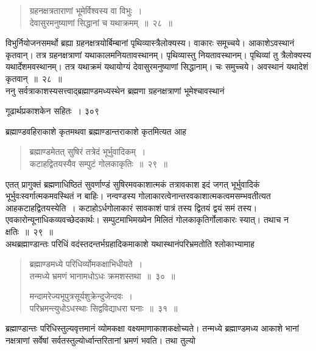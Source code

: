 \documentclass[11pt, openany]{book}
\begin{document}
 \begin{quote}
 {\ssi ग्रहनक्षत्रताराणां भूमेर्विश्वस्य वा विभुः~।\\
देवासुरमनुष्याणां सिद्धानां च यथाक्रमम्~॥~२८~॥}
\end{quote}

 विभुर्नियोजनसमर्थो ब्रह्या ग्रहनक्षत्रयोर्बिम्बानां पृथिव्यास्त्रैलोक्यस्य। वाकारः समूच्चये। आकाशेऽवस्थानं कृतवान्। तत्र ग्रहनक्षत्राणां यथाकालमनियतावस्थानम्। पृथिव्यास्तु नियतावस्थानम्। पृथिव्यां तु त्रैलोक्यस्य यथार्देशमवस्थानम्। तत्र यथाक्रमं यथायोग्यं देवासुरमनुष्याणां सिद्धानाम्। चः समुच्चये। अवस्थानं यथादेशं कृतवान्~॥~२८~॥ \\
\noindent ननु सर्वत्राकाशस्यसत्त्वाद्ब्रह्माण्डमध्यस्थेन ब्रह्मणा ग्रहनक्षत्राणां भूमेश्चावस्थानं \textendash


\newpage


\hspace{3cm} गूढार्थप्रकाशकेन सहितः~।  \hfill ३०९
\vspace{1cm}


\noindent ब्रह्माण्डवहिराकाशे कृतमथवा ब्रह्माण्डान्तराकाशे कृतमित्यत आह \textendash

 \begin{quote}
{\ssi ब्रह्माण्डमेतत् सुषिरं तत्रेदं भूर्भुवादिकम्~।\\
कटाहद्वितयस्यैव सम्पुटं गोलकाकृतिः~॥~२९~॥}
\end{quote}
 एतत् प्रागुक्तं ब्रह्मणाधिष्ठितं सुवर्णाण्डं सुषिरमवकाशात्मकं तत्रावकाश इदं जगत् भूर्भुवादिकं भूर्भुवःस्वर्गात्मकमवस्थितं न बाहिः। नन्वण्डस्य गोलाकारत्वेनान्तरवकाशात्मकत्वमसम्भवतीत्यत आह\textendash कटाहद्वितयस्येति~। कटाहोऽर्धगोलाकारं सावकाशं पात्रं तस्य द्वितयं द्वयं समं तस्य। एवकारोन्यूनाधिकव्यवच्छेदकार्थः। सम्पुटमाभिमख्येन मिलितं गोलकाकृतिर्गोलाकारः स्यात्। तथाच न क्षतिः~॥~२९~॥\\
\noindent अथब्रह्माण्डान्तः परिधिं वदंस्तदन्तर्भग्रहादिकमाकाशे यथास्थानंपरिभ्रमतोति श्लोकाभ्यामाह \textendash

\begin{quote}
{\ssi ब्रह्माण्डमध्ये परिधिर्व्योमकक्षाभिधीयते~।\\
तन्मध्ये भ्रमणं भानामधोऽधः क्रमशस्तथा~॥~३०~॥

मन्दामरेज्यभूपुत्रसूर्यशुक्रेन्दुजेन्दवः~।\\
परिभ्रमन्त्युधोऽधस्थाः सिद्वविद्याधरा घनाः~॥~३१~॥}
\end{quote}
 ब्रह्माण्डान्तः परिधिस्तुल्यवृत्तमानं व्योमकक्षा वक्ष्यमाणाकाशकक्षोच्यते। तन्मध्ये ब्रह्माण्डमध्य आकाशे भानां नक्षत्राणां सर्वेषां सर्वतस्तुल्योर्ध्वान्तरितानां भ्रमणं भवति। तथा तुल्यो \textendash
\end{document}
